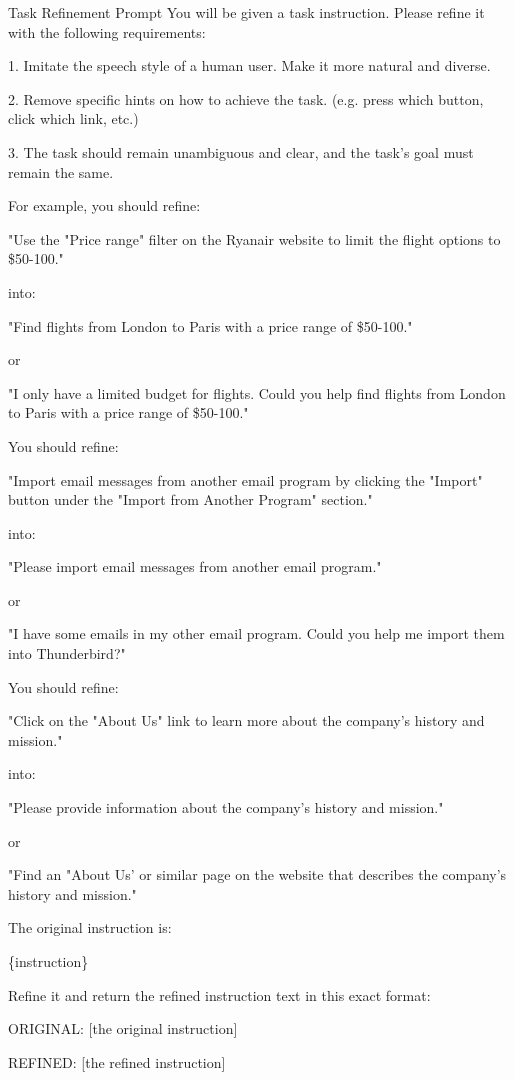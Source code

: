 \documentclass{article} %
\begin{document}
\begin{fancybox}{Task Refinement Prompt}
You will be given a task instruction. Please refine it with the following requirements:
\bigskip

1. Imitate the speech style of a human user. Make it more natural and diverse.

2. Remove specific hints on how to achieve the task. (e.g. press which button, click which link, etc.)

3. The task should remain unambiguous and clear, and the task's goal must remain the same.
\bigskip

For example, you should refine:

"Use the "Price range" filter on the Ryanair website to limit the flight options to \$50-100."

into:

"Find flights from London to Paris with a price range of \$50-100."

or

"I only have a limited budget for flights. Could you help find flights from London to Paris with a price range of \$50-100."
\bigskip

You should refine:

"Import email messages from another email program by clicking the "Import" button under the "Import from Another Program" section."

into:

"Please import email messages from another email program."

or

"I have some emails in my other email program. Could you help me import them into Thunderbird?"
\bigskip

You should refine:

"Click on the "About Us" link to learn more about the company's history and mission."

into:

"Please provide information about the company's history and mission."

or

"Find an "About Us' or similar page on the website that describes the company's history and mission."
\bigskip

The original instruction is:

\{instruction\}

Refine it and return the refined instruction text in this exact format:
\bigskip

ORIGINAL: [the original instruction]

REFINED: [the refined instruction]
\end{fancybox}
\end{document}
